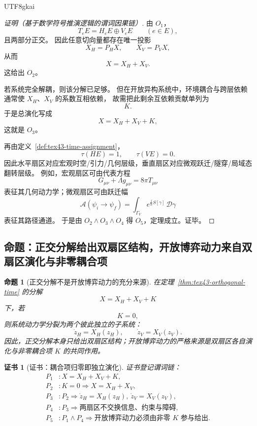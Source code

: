\documentclass[12pt]{article}
\newtheorem{proposition}{命题}[section]
\newtheorem{Certificate}{证书}[section]
\begin{document}
\begin{CJK*}{UTF8}{gkai}
\begin{proof}[证明（基于数学符号推演逻辑的谓词因果链）]
由 $O_1$，
\[
  T_eE=H_eE\oplus V_eE
  \qquad (e\in E),
\]
且两部分正交。
因此任意切向量都存在唯一投影
\[
  X_H=P_HX,\qquad X_V=P_VX,
\]
从而
\[
  X=X_H+X_V.
\]
这给出 $O_2$。

若系统完全解耦，则该分解已足够。
但在开放异构系统中，环境耦合与跨层依赖通常使 $X_H$、$X_V$ 的系数互相依赖，
故需把此剩余互依赖贡献单列为
\[
  K.
\]
于是总演化写成
\[
  X=X_H+X_V+K,
\]
这就是 $O_3$。

再由定义~\ref{def:tex43-time-assignment}，
\[
  \tau(HE)=1,\qquad \tau(VE)=0.
\]
因此水平扇区对应宏观时空/引力/几何层级，垂直扇区对应微观跃迁/隧穿/局域态翻转层级。
例如，宏观扇区可由代表方程
\[
  G_{\mu\nu}+\Lambda g_{\mu\nu}=8\pi T_{\mu\nu}
\]
表征其几何动力学；微观扇区可由跃迁幅
\[
  \mathcal A(\psi_i\to\psi_f)
  =
  \int_{\Gamma_V}
  e^{\frac{i}{\hbar}S[\gamma]}\,\mathcal D\gamma
\]
表征其路径通道。
于是由 $O_2\wedge O_3\wedge O_4$ 得 $O_5$，定理成立。证毕。
\end{proof}

\subsection{命题：正交分解给出双扇区结构，开放博弈动力来自双扇区演化与非零耦合项}
\label{subsec:tex43-ch2-proposition-decoupling}

\begin{proposition}[正交分解不是开放博弈动力的充分来源]
\label{prop:tex43-decoupling-not-dynamics}
在定理~\ref{thm:tex43-orthogonal-time} 的分解
\[
  X=X_H+X_V+K
\]
下，若
\[
  K=0,
\]
则系统动力学分裂为两个彼此独立的子系统：
\[
  \dot z_H=X_H(z_H),
  \qquad
  \dot z_V=X_V(z_V).
\]
因此，正交分解本身只给出双扇区结构；开放博弈动力的严格来源是双扇区各自演化与非零耦合项 $K$ 的共同作用。
\end{proposition}

\begin{Certificate}[证书：耦合项归零即独立演化]
\label{cert:tex43-decoupling-not-dynamics}
证书登记谓词链：
\[
\begin{aligned}
  P_1 &: X=X_H+X_V+K,\\
  P_2 &: K=0 \Rightarrow X=X_H+X_V,\\
  P_3 &: P_2 \Rightarrow \dot z_H=X_H(z_H),\ \dot z_V=X_V(z_V),\\
  P_4 &: P_3 \Rightarrow \text{两扇区不交换信息、约束与障碍},\\
  P_5 &: P_1\wedge P_4 \Rightarrow \text{开放博弈动力必须由非零 }K\text{ 参与给出}.
\end{aligned}
\]
\end{Certificate}


\end{CJK*}
\end{document}
